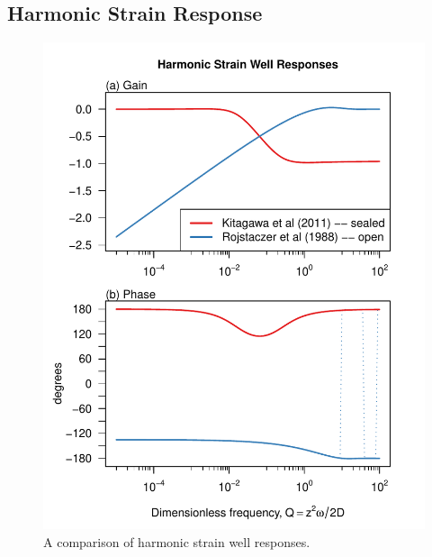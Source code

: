 \documentclass[10pt]{article}\usepackage[]{graphicx}\usepackage[]{color}
\makeatletter
\def\maxwidth{ %
  \ifdim\Gin@nat@width>\linewidth
    \linewidth
  \else
    \Gin@nat@width
  \fi
}
\newenvironment{knitrout}{}{} %
\makeatother
\begin{document}
\subsection{Harmonic Strain Response}
\begin{figure}[htb!]
\begin{center}
\begin{knitrout}
\color{fgcolor}
\includegraphics[width=\maxwidth]{figure/ALLRESPFIG} 

\end{knitrout}

\caption{A comparison of harmonic strain well responses.}
\label{fig:ewrsp-all}
\end{center}
\end{figure}
\end{document}

